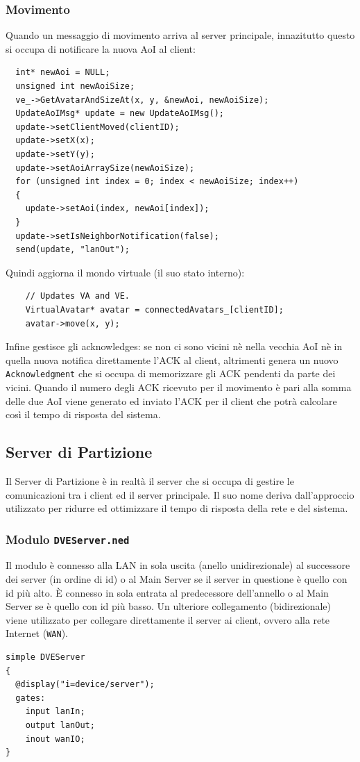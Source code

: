 \documentclass[a4paper, 11pt, oneside]{book}
\theoremstyle{definition}
\theoremstyle{remark}
\begin{document}
\subsubsection{Movimento}
Quando un messaggio di movimento arriva al server principale, innazitutto
questo si occupa di notificare la nuova AoI al client:
\begin{lstlisting}
  int* newAoi = NULL;
  unsigned int newAoiSize;
  ve_->GetAvatarAndSizeAt(x, y, &newAoi, newAoiSize);
  UpdateAoIMsg* update = new UpdateAoIMsg();
  update->setClientMoved(clientID);
  update->setX(x);
  update->setY(y);
  update->setAoiArraySize(newAoiSize);
  for (unsigned int index = 0; index < newAoiSize; index++)
  {
    update->setAoi(index, newAoi[index]);
  }
  update->setIsNeighborNotification(false);
  send(update, "lanOut");
\end{lstlisting}
Quindi aggiorna il mondo virtuale (il suo stato interno):
\begin{lstlisting}
    // Updates VA and VE.
    VirtualAvatar* avatar = connectedAvatars_[clientID];
    avatar->move(x, y);
\end{lstlisting}
Infine gestisce gli acknowledges: se non ci sono vicini nè nella vecchia AoI
nè in quella nuova notifica direttamente l'ACK al client, altrimenti genera un
nuovo \texttt{Acknowledgment} che si occupa di memorizzare gli ACK pendenti da
parte dei vicini.
Quando il numero degli ACK ricevuto per il movimento è pari alla somma
delle due AoI viene generato ed inviato l'ACK per il client che potrà calcolare
così il tempo di risposta del sistema.

\subsection{Server di Partizione}
Il Server di Partizione è in realtà il server che si occupa di gestire le
comunicazioni tra i client ed il server principale. Il suo nome deriva
dall'approccio utilizzato per ridurre ed ottimizzare il tempo di risposta della
rete e del sistema.

\subsubsection{Modulo \texttt{DVEServer.ned}}
Il modulo è connesso alla LAN in sola uscita (anello unidirezionale) al
successore dei server (in ordine di id) o al Main Server se il server in
questione è quello con id più alto. \`E connesso in sola entrata al
predecessore dell'annello o al Main Server se è quello con id più basso. Un ulteriore
collegamento (bidirezionale) viene utilizzato per collegare direttamente
il server ai client, ovvero alla rete Internet (\texttt{WAN}).
\begin{lstlisting}
simple DVEServer
{
  @display("i=device/server");
  gates:
    input lanIn;
    output lanOut;
    inout wanIO;
}
\end{lstlisting}
\end{document}
